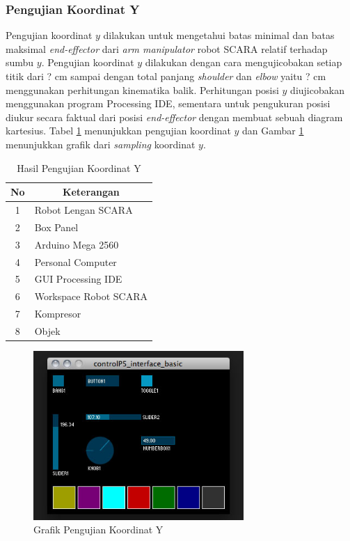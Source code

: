 \subsubsection{Pengujian Koordinat Y}
Pengujian koordinat $y$ dilakukan untuk mengetahui batas minimal dan batas maksimal \textit{end-effector} dari \textit{arm manipulator} robot SCARA relatif terhadap sumbu $y$. Pengujian koordinat $y$ dilakukan dengan cara mengujicobakan setiap titik dari ? cm sampai dengan total panjang \textit{shoulder} dan \textit{elbow} yaitu ? cm menggunakan perhitungan kinematika balik. Perhitungan posisi $y$ diujicobakan menggunakan program Processing IDE, sementara untuk pengukuran posisi diukur secara faktual dari posisi \textit{end-effector} dengan membuat sebuah diagram kartesius. Tabel \ref{tbl.koordinaty} menunjukkan pengujian koordinat $y$ dan Gambar \ref{pic.koordinaty} menunjukkan grafik dari \textit{sampling} koordinat $y$.
 \begin{table}[H]
 	\centering
 	\caption{Hasil Pengujian Koordinat Y}
 	\label{tbl.koordinaty}
 	\begin{tabular}{|c|l|}
 		\hline
 		\rowcolor[HTML]{9B9B9B} 
 		
 		No & \multicolumn{1}{c|}{\cellcolor[HTML]{9B9B9B}Keterangan} \\ \hline
 		1  & Robot Lengan SCARA                                      \\ \hline
 		2  & Box Panel                                               \\ \hline
 		3  & Arduino Mega 2560                                       \\ \hline
 		4  & Personal Computer                                       \\ \hline
 		5  & GUI Processing IDE                                      \\ \hline
 		6  & Workspace Robot SCARA                                   \\ \hline
 		7  & Kompresor                                               \\ \hline
 		8  & Objek                                                   \\ \hline
 	\end{tabular}
 	
 \end{table} 
 \begin{figure}[H]
 	\centering
 	\includegraphics[width=8cm]{gambar/controlp5.jpg}
 	\caption{Grafik Pengujian Koordinat Y}
 	\label{pic.koordinaty}
 \end{figure}


